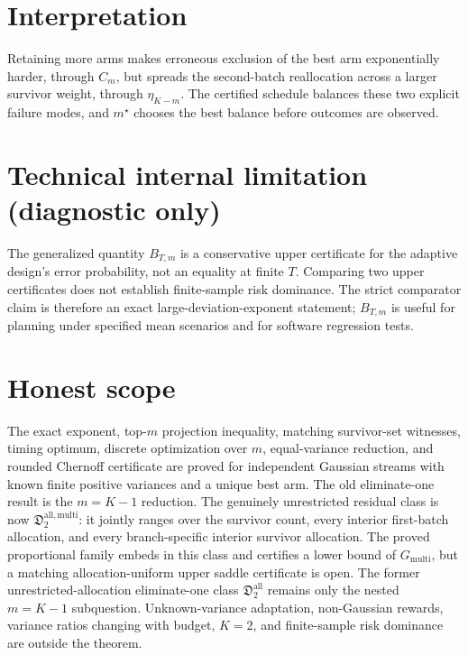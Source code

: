 \documentclass{article}
\begin{document}
\section{Interpretation}

Retaining more arms makes erroneous exclusion of the best arm exponentially harder, through \(C_m\), but spreads the second-batch reallocation across a larger survivor weight, through \(\eta_{K-m}\). The certified schedule balances these two explicit failure modes, and \(m^\star\) chooses the best balance before outcomes are observed.

\section*{Technical internal limitation (diagnostic only)}

The generalized quantity \(B_{T,m}\) is a conservative upper certificate for the adaptive design's error probability, not an equality at finite \(T\). Comparing two upper certificates does not establish finite-sample risk dominance. The strict comparator claim is therefore an exact large-deviation-exponent statement; \(B_{T,m}\) is useful for planning under specified mean scenarios and for software regression tests.

\section{Honest scope}

The exact exponent, top-\(m\) projection inequality, matching survivor-set witnesses, timing optimum, discrete optimization over \(m\), equal-variance reduction, and rounded Chernoff certificate are proved for independent Gaussian streams with known finite positive variances and a unique best arm. The old eliminate-one result is the \(m=K-1\) reduction. The genuinely unrestricted residual class is now \(\mathfrak D_2^{\mathrm{all,multi}}\): it jointly ranges over the survivor count, every interior first-batch allocation, and every branch-specific interior survivor allocation. The proved proportional family embeds in this class and certifies a lower bound of \(G_{\mathrm{multi}}\), but a matching allocation-uniform upper saddle certificate is open. The former unrestricted-allocation eliminate-one class \(\mathfrak D_2^{\mathrm{all}}\) remains only the nested \(m=K-1\) subquestion. Unknown-variance adaptation, non-Gaussian rewards, variance ratios changing with budget, \(K=2\), and finite-sample risk dominance are outside the theorem.
\end{document}
